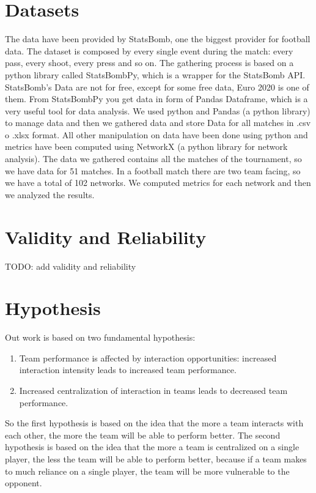 \documentclass[12pt, a4paper]{article}
\begin{document}

\section{Datasets}
\label{datasets}
The data have been provided by StatsBomb, one the biggest provider for football data. The dataset is composed by every single event during the match: every pass, every shoot, every press and so on. 
The gathering process is based on a python library called StatsBombPy, which is a wrapper for the StatsBomb API. 
StatsBomb's Data are not for free, except for some free data, Euro 2020 is one of them. From StatsBombPy you get data in form of Pandas Dataframe, which is a very useful tool for data analysis. We used python and Pandas (a python library) to manage data and then we gathered data and store Data for all matches in .csv o .xlsx format. All other manipulation on data have been done using python and metrics have been computed using NetworkX (a python library for network analysis). The data we gathered contains all the matches of the tournament, so we have data for 51 matches. In a football match there are two team facing, so we have a total of 102 networks. We computed metrics for each network and then we analyzed the results.

\section{Validity and Reliability }
\label{validity-and-reliability-not-needed-for-the-project-proposal}
TODO: add validity and reliability


\section{Hypothesis}
Out work is based on two fundamental hypothesis:
\begin{enumerate}
        \item Team performance is affected by interaction opportunities: increased interaction intensity leads to increased team performance.
        \item Increased centralization of interaction in teams leads to decreased team performance.
\end{enumerate}
So the first hypothesis is based on the idea that the more a team interacts with each other, the more the team will be able to perform better. The second hypothesis is based on the idea that the more a team is centralized on a single player, the less the team will be able to perform better, because if a team makes to much reliance on a single player, the team will be more vulnerable to the opponent. 
\end{document}
